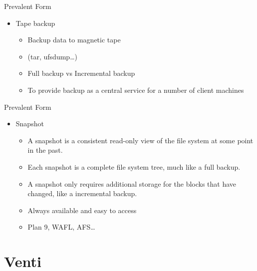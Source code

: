 \begin{frame}{Prevalent Form}

\begin{itemize}
\itemsep1pt\parskip0pt
\item
  Tape backup

  \begin{itemize}
  \itemsep1pt\parskip0pt
  \item
    Backup data to magnetic tape
  \item
    (tar, ufsdump\ldots{})
  \item
    Full backup vs Incremental backup
  \item
    To provide backup as a central service for a number of client
    machines
  \end{itemize}
\end{itemize}

\end{frame}

\begin{frame}{Prevalent Form}

\begin{itemize}
\itemsep1pt\parskip0pt
\item
  Snapshot

  \begin{itemize}
  \itemsep1pt\parskip0pt
  \item
    A snapshot is a consistent read-only view of the file system at some
    point in the past.
  \item
    Each snapshot is a complete file system tree, much like a full
    backup.
  \item
    A snapshot only requires additional storage for the blocks that have
    changed, like a incremental backup.
  \item
    Always available and easy to access
  \item
    Plan 9, WAFL, AFS\ldots{}
  \end{itemize}
\end{itemize}

\end{frame}

\section{Venti}\label{venti}

